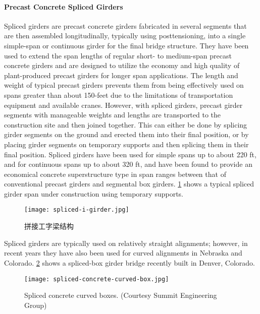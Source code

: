 \paragraph{Precast Concrete Spliced Girders}
Spliced girders are precast concrete girders fabricated in several segments that are then assembled longitudinally, typically using posttensioning, into a single simple-span or continuous girder for the final bridge structure. They have been used to extend the span lengths of regular short- to medium-span precast concrete girders and are designed to utilize the economy and high quality of plant-produced precast girders for longer span applications. The length and weight of typical precast girders prevents them from being effectively used on spans greater than about 150-feet due to the limitations of transportation equipment and available cranes. However, with spliced girders, precast girder segments with manageable weights and lengths are transported to the construction site and then joined together. This can either be done by splicing girder segments on the ground and erected them into their final position, or by placing girder segments on temporary supports and then splicing them in their final position. Spliced girders have been used for simple spans up to about 220 ft, and for continuous spans up to about 320 ft, and have been found to provide an economical concrete superstructure type in span ranges between that of conventional precast girders and segmental box girders. \cref{fig:spliced-i-girder} shows a typical spliced girder span under construction using temporary supports.

\begin{figure}
  \texttt{[image: spliced-i-girder.jpg]}
  \caption{拼接工字梁结构}
  \label{fig:spliced-i-girder}
\end{figure}


Spliced girders are typically used on relatively straight alignments; however, in recent years they have also been used for curved alignments in Nebraska and Colorado. \cref{fig:spliced-concrete-curved-box} shows a spliced-box girder bridge recently built in Denver, Colorado.


\begin{figure}
  \texttt{[image: spliced-concrete-curved-box.jpg]}
  \caption{Spliced concrete curved boxes. (Courtesy Summit Engineering Group)}
  \label{fig:spliced-concrete-curved-box}
\end{figure}

